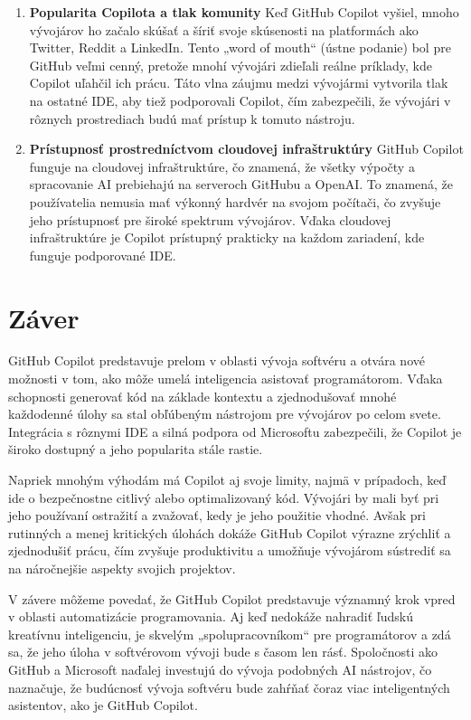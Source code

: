 \documentclass[10pt,oneside,slovak,a4paper, onecolumn]{article}
\begin{document}
\begin{enumerate}
    \item \textbf{Popularita Copilota a tlak komunity}
    Keď GitHub Copilot vyšiel, mnoho vývojárov ho začalo skúšať a šíriť svoje skúsenosti na platformách ako Twitter, Reddit a LinkedIn. Tento „word of mouth“ (ústne podanie) bol pre GitHub veľmi cenný, pretože mnohí vývojári zdieľali reálne príklady, kde Copilot uľahčil ich prácu. Táto vlna záujmu medzi vývojármi vytvorila tlak na ostatné IDE, aby tiež podporovali Copilot, čím zabezpečili, že vývojári v rôznych prostrediach budú mať prístup k tomuto nástroju.
    \item \textbf{Prístupnosť prostredníctvom cloudovej infraštruktúry}
    GitHub Copilot funguje na cloudovej infraštruktúre, čo znamená, že všetky výpočty a spracovanie AI prebiehajú na serveroch GitHubu a OpenAI. To znamená, že používatelia nemusia mať výkonný hardvér na svojom počítači, čo zvyšuje jeho prístupnosť pre široké spektrum vývojárov. Vďaka cloudovej infraštruktúre je Copilot prístupný prakticky na každom zariadení, kde funguje podporované IDE.
    \end{enumerate}\cite{medium2}





\section{Záver} \label{zaver} %
GitHub Copilot predstavuje prelom v oblasti vývoja softvéru a otvára nové možnosti v tom, ako môže umelá inteligencia asistovať programátorom. Vďaka schopnosti generovať kód na základe kontextu a zjednodušovať mnohé každodenné úlohy sa stal obľúbeným nástrojom pre vývojárov po celom svete. Integrácia s rôznymi IDE a silná podpora od Microsoftu zabezpečili, že Copilot je široko dostupný a jeho popularita stále rastie.

Napriek mnohým výhodám má Copilot aj svoje limity, najmä v prípadoch, keď ide o bezpečnostne citlivý alebo optimalizovaný kód. Vývojári by mali byť pri jeho používaní ostražití a zvažovať, kedy je jeho použitie vhodné. Avšak pri rutinných a menej kritických úlohách dokáže GitHub Copilot výrazne zrýchliť a zjednodušiť prácu, čím zvyšuje produktivitu a umožňuje vývojárom sústrediť sa na náročnejšie aspekty svojich projektov.

V závere môžeme povedať, že GitHub Copilot predstavuje významný krok vpred v oblasti automatizácie programovania. Aj keď nedokáže nahradiť ľudskú kreatívnu inteligenciu, je skvelým „spolupracovníkom“ pre programátorov a zdá sa, že jeho úloha v softvérovom vývoji bude s časom len rásť. Spoločnosti ako GitHub a Microsoft naďalej investujú do vývoja podobných AI nástrojov, čo naznačuje, že budúcnosť vývoja softvéru bude zahŕňať čoraz viac inteligentných asistentov, ako je GitHub Copilot.








\end{document}
